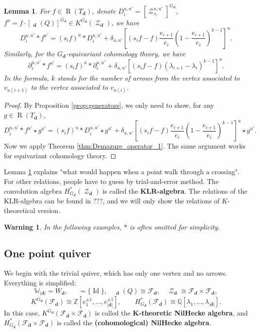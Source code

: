 \documentclass[reqno,11pt]{book}
\numberwithin{equation}{section}
\theoremstyle{plain}
\newtheorem{lemma}[theorem]{Lemma}
\newtheorem{warning}[theorem]{Warning}
\theoremstyle{plain}
\numberwithin{equation}{section}
\theoremstyle{remark}
\DeclareMathOperator{\Id}{\operatorname{Id}}
\DeclareMathOperator{\RRep}{\widetilde{\operatorname{Rep}}}
\DeclareMathOperator{\Rpt}{\operatorname{R}}
\DeclareMathOperator{\St}{\mathcal{Z}}
\newcommand{\dimvec}[1]{\mathbf{#1}}
\newcommand{\abdimvec}[1]{|\dimvec{#1}|}
\newcommand{\absgp}[1]{\mathbb{#1}}
\DeclareMathOperator{\MinWd}{\operatorname{Min}(\absgp{W}_{\abdimvec{d}},W_{\dimvec{d}})}
\newcommand{\WWd}{\absgp{W}_{\abdimvec{d}}}
\newcommand{\Wd}{W_{\dimvec{d}}}
\newcommand{\fakestar}{*}
\begin{document}
\begin{lemma}\label{lem:convolution_product_1}
For $f \in \Rpt(T_{\dimvec{d}})$, denote $D_i^{u,u'} =\left[\St_{s_{i}}^{u,u'}\right]^{G_{\dimvec{d}}}$, $f^{u}=f \cdot \left[ \RRep_{\dimvec{d}}(Q) \right]^{G_{\dimvec{d}}} \in K^{G_{\dimvec{d}}} (\St_{\dimvec{d}})$, we have
$$D_i^{u,u'} \fakestar f^{u'}= (s_i f)^{u} \fakestar D_i^{u,u'} +  \delta_{u,u'}\left[\left(s_i f-f\right) \frac{e_{i+1}}{e_i}  \left(\displaystyle 1-\frac{e_{i+1}}{e_{i}}\right)^{k-1} \right]^{u}.$$
Similarly, for the $G_{\dimvec{d}}$-equivariant cohomology theory, we have
$$\partial_i^{u,u'} \fakestar f^{u'}= (s_i f)^{u} \fakestar \partial_i^{u,u'} +  \delta_{u,u'}\left[\left(s_i f-f\right)   \left(\lambda_{i+1}-\lambda_{i}\right)^{k-1} \right]^{u}.$$
In the formula, $k$ stands for the number of arrows from the vertex associated to $v_{u(i+1)}$ to the vertex associated to $v_{u(i)}$.
\end{lemma}
\begin{proof}
By Proposition \ref{prop:generators}, we only need to show, for any $g \in \Rpt(T_{\dimvec{d}})$,
$$D_i^{u,u'} \fakestar f^{u'} \star g^{u'}= (s_i f)^{u} \fakestar D_i^{u,u'} \star g^{u'} +  \delta_{u,u'}\left[\left(s_i f-f\right) \frac{e_{i+1}}{e_i}  \left(\displaystyle 1-\frac{e_{i+1}}{e_{i}}\right)^{k-1} \right]^{u} \star g^{u'}.$$
Now we apply Theorem \ref{thm:Demazure_operator_1}. The same argument works for equivariant cohomology theory.
\end{proof}
Lemma \ref{lem:convolution_product_1} explains "what would happen when a point walk through a crossing". For other relations, people have to guess by trial-and-error method. The convolution algebra $H_{G_{\dimvec{d}}}^{*}(\St_{\dimvec{d}})$ is called the \textbf{KLR-algebra}. The relations of the KLR-algebra can be found in ???, and we will only show the relations of $K$-theoretical version.
\begin{warning}
In the following examples, $\fakestar$ is often omitted for simplicity.
\end{warning}
\subsection{One point quiver}
We begin with the trivial quiver, which has only one vertex and no arrows. Everything is simplified: 
$$\WWd=\Wd,\quad \MinWd =\{\Id \}, \quad \RRep_{\dimvec{d}}(Q) \cong \mathcal{F}_{\dimvec{d}}, \quad \St_{\dimvec{d}} \cong\mathcal{F}_{\dimvec{d}} \times \mathcal{F}_{\dimvec{d}},$$
$$K^{G_{\dimvec{d}}} (\mathcal{F}_{\dimvec{d}}) \cong \mathbb{Z}\!\left[ e_1^{\pm 1},\ldots,e_{\abdimvec{d}}^{\pm 1} \right], \qquad H_{G_{\dimvec{d}}}^{*}(\mathcal{F}_{\dimvec{d}}) \cong \mathbb{Q}[\lambda_1,\ldots,\lambda_{\abdimvec{d}}].$$
In this case, $K^{G_{\dimvec{d}}} (\mathcal{F}_{\dimvec{d}} \times  \mathcal{F}_{\dimvec{d}})$ is called the \textbf{$\boldsymbol{K}$-theoretic NilHecke algebra}, and $H_{G_{\dimvec{d}}}^{*}(\mathcal{F}_{\dimvec{d}} \times  \mathcal{F}_{\dimvec{d}})$ is called the \textbf{(cohomological) NilHecke algebra}.
\end{document}
